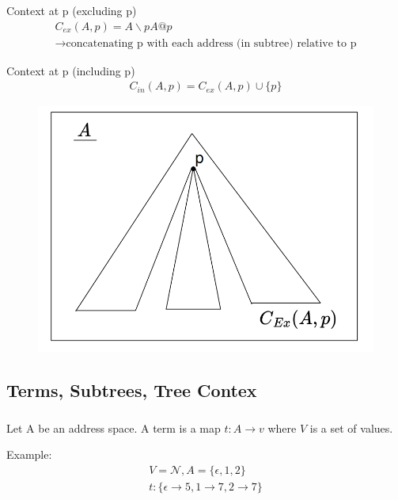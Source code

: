 \subsubsection{}
Context at p (excluding p)
\begin{gather}
    C_{ex}(A, p) = A\backslash pA@p\\
    \xrightarrow{} \text{concatenating p with each address (in subtree) relative to p}
\end{gather}

Context at p (including p)
\begin{gather}
    C_{in}(A, p) = C_{ex}(A,p) \cup \{p\}
\end{gather}
\begin{figure}[htbp]
    \center
    \includegraphics[scale=0.5]{images/popl-4-2.png}
    \caption{}
\end{figure}

\subsection{Terms, Subtrees, Tree Contex}
\subsubsection{}
Let A be an address space. A term is a map $t:A\xrightarrow{}v$ where $V$ is a set of values.

Example:
\begin{gather}
    V = \mathcal{N}, A = \{\epsilon, 1, 2\}\\
    t: \{\epsilon\xrightarrow{}5, 1\xrightarrow{}7, 2\xrightarrow{}7\}
\end{gather}

